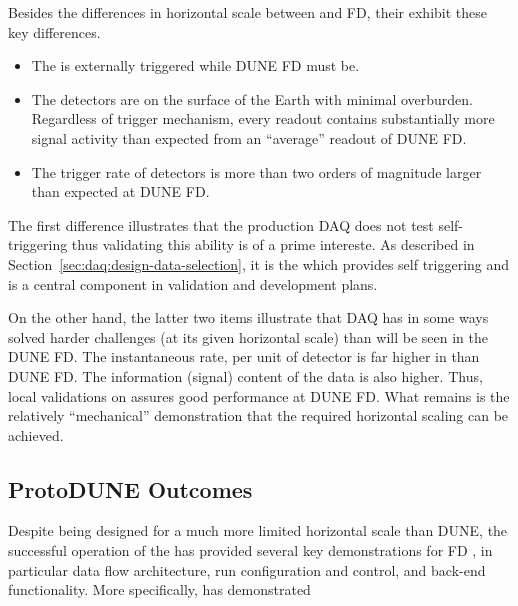 Besides the differences in horizontal scale between 
and  FD, their  exhibit these key differences. 
\begin{itemize}
\item The   is externally triggered while
  DUNE FD must be. 
\item The  detectors are on the surface of the Earth
  with minimal overburden. 
  Regardless of trigger mechanism, every readout contains substantially
  more signal activity than expected from an ``average'' readout of DUNE
  FD.
\item The trigger rate of  detectors is more than two
  orders of magnitude larger than expected at DUNE FD.

\end{itemize}

The first difference illustrates that the production 
DAQ does not test self-triggering thus validating this ability is of a
prime intereste.
As described in Section~\ref{sec:daq:design-data-selection}, it is the
 which provides self triggering and is a central component
in validation and development plans.
 
On the other hand, the latter two items illustrate that
 DAQ has in some ways solved harder challenges (at its
given horizontal scale) than will be seen in the DUNE FD. 
The instantaneous rate, per unit of detector is far higher in
 than DUNE FD. 
The information (signal) content of the data is also higher. 
Thus, local validations on  assures good performance at
DUNE FD. 
What remains is the relatively ``mechanical'' demonstration that the
required horizontal scaling can be achieved.  

\subsection{ProtoDUNE Outcomes}

Despite being designed for a much more limited horizontal scale than
DUNE, the successful operation of the   has
provided several key demonstrations for  FD , in
particular data flow architecture, run configuration and control, and
back-end functionality.
More specifically,  has demonstrated


